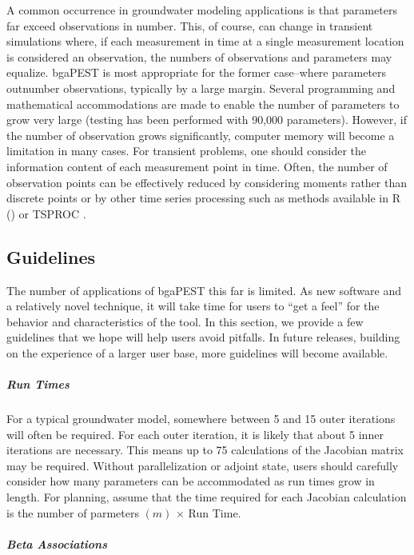 \documentclass[11pt,oneside,onecolumn]{usgsreport}
\begin{document}
\begin{multicols}{2}
A common occurrence in groundwater modeling applications is that parameters
far exceed observations in number. This, of course, can change in
transient simulations where, if each measurement in time at a single
measurement location is considered an observation, the numbers of
observations and parameters may equalize. bgaPEST is most appropriate
for the former case--where parameters outnumber observations, typically
by a large margin. Several programming and mathematical accommodations
are made to enable the number of parameters to grow very large (testing
has been performed with 90,000 parameters). However, if the number
of observation grows significantly, computer memory will become a
limitation in many cases. For transient problems, one should consider
the information content of each measurement point in time. Often,
the number of observation points can be effectively reduced by considering
moments rather than discrete points \citep{LiNowakCirpka2005} or
by other time series processing such as methods available in R (\citep{R})
or TSPROC \citep{TSPROC}.


\subsection{Guidelines}

The number of applications of bgaPEST this far is limited. As new
software and a relatively novel technique, it will take time for users
to ``get a feel'' for the behavior and characteristics of the tool.
In this section, we provide a few guidelines that we hope will help
users avoid pitfalls. In future releases, building on the experience
of a larger user base, more guidelines will become available.


\subparagraph*{Run Times}

For a typical groundwater model, somewhere between 5 and 15 outer
iterations will often be required. For each outer iteration, it is
likely that about 5 inner iterations are necessary. This means up
to 75 calculations of the Jacobian matrix may be required. Without
parallelization or adjoint state, users should carefully consider
how many parameters can be accommodated as run times grow in length.
For planning, assume that the time required for each Jacobian calculation
is the number of parmeters $\left(m\right)$ $\times$ Run Time. 


\subparagraph*{Beta Associations}


\end{multicols}
\end{document}
